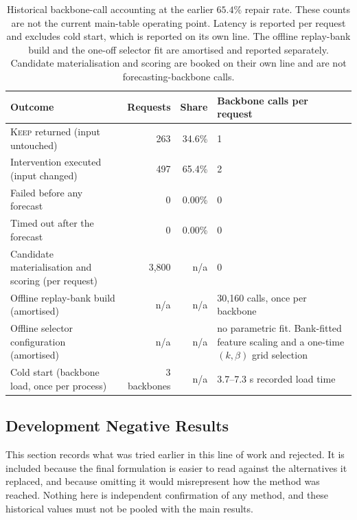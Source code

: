 \documentclass{article}
\begin{document}
\begin{table}[tp]
  \caption{Historical backbone-call accounting at the earlier $65.4\%$ repair rate.
  These counts are not the current main-table operating point. Latency is reported per request and excludes cold start,
  which is reported on its own line. The offline replay-bank build and the one-off selector fit
  are amortised and reported separately. Candidate materialisation and scoring are booked on
  their own line and are not forecasting-backbone calls.}
  \label{tab:app-calls}
  \centering
  \small
  \setlength{\tabcolsep}{4pt}
\begin{tabularx}{\textwidth}{@{}XrrX@{}}
    \toprule
    Outcome & Requests & Share & Backbone calls per request \\
    \midrule
    \textsc{Keep} returned (input untouched)   & 263    & 34.6\%    & 1 \\
    Intervention executed (input changed)      & 497     & 65.4\%     & 2 \\
    Failed before any forecast                 & 0    & 0.00\%    & 0 \\
    Timed out after the forecast               & 0 & 0.00\% & 0 \\
    \midrule
    Candidate materialisation and scoring (per request) & 3,800 & n/a & 0 \\
    Offline replay-bank build (amortised)      & n/a & n/a & 30,160 calls, once per backbone \\
    Offline selector configuration (amortised)  & n/a & n/a & no parametric fit. Bank-fitted feature scaling and a one-time $(k,\beta)$ grid selection \\
    Cold start (backbone load, once per process) & 3 backbones & n/a & 3.7--7.3 s recorded load time \\
    \bottomrule
  \end{tabularx}
\end{table}

\subsection{Development Negative Results}
\label{app:development}
This section records what was tried earlier in this line of work and rejected. It is included
because the final formulation is easier to read against the alternatives it replaced, and
because omitting it would misrepresent how the method was reached. Nothing here is independent
confirmation of any method, and these historical values must not be pooled with the main results.
\end{document}
